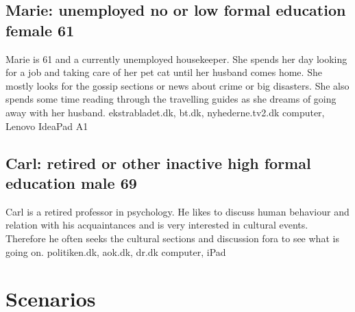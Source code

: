 \subsection{Marie: unemployed no or low formal education female 61}
Marie is 61 and a currently unemployed housekeeper. She spends her day looking for a job and taking care of her pet cat until her husband comes home. She mostly looks for the gossip sections or news about crime or big disasters. She also spends some time reading through the travelling guides as she dreams of going away with her husband.
ekstrabladet.dk, bt.dk, nyhederne.tv2.dk
computer, Lenovo IdeaPad A1

\subsection{Carl: retired or other inactive high formal education male 69}
Carl is a retired professor in psychology. He likes to discuss human behaviour and relation with his acquaintances and is very interested in cultural events. Therefore he often seeks the cultural sections and discussion fora to see what is going on. 
politiken.dk, aok.dk, dr.dk
computer, iPad

\section{Scenarios}
